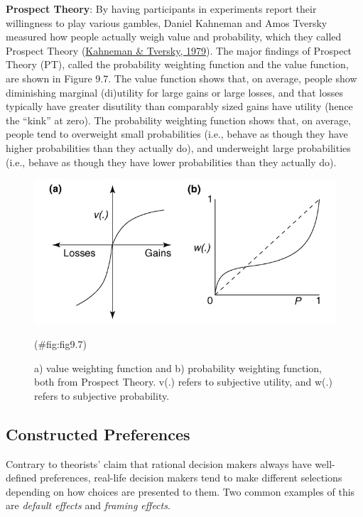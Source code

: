 \documentclass[
]{krantz}
\begin{document}
\textbf{Prospect Theory}: By having participants in experiments report their willingness to play various gambles, Daniel Kahneman and Amos Tversky measured how people actually weigh value and probability, which they called Prospect Theory (\protect\hyperlink{ref-kahneman1979prospect}{Kahneman \& Tversky, 1979}). The major findings of Prospect Theory (PT), called the probability weighting function and the value function, are shown in Figure 9.7. The value function shows that, on average, people show diminishing marginal (di)utility for large gains or large losses, and that losses typically have greater disutility than comparably sized gains have utility (hence the ``kink'' at zero). The probability weighting function shows that, on average, people tend to overweight small probabilities (i.e., behave as though they have higher probabilities than they actually do), and underweight large probabilities (i.e., behave as though they have lower probabilities than they actually do).

\begin{figure}

{\centering \includegraphics[width=0.6\linewidth]{images/ch9/fig7} 

}

\caption{a) value weighting function and b) probability weighting function, both from Prospect Theory. v(.) refers to subjective utility, and w(.) refers to subjective probability.}(\#fig:fig9.7)
\end{figure}

\hypertarget{constructed-preferences}{%
\subsection*{Constructed Preferences}\label{constructed-preferences}}


Contrary to theorists' claim that rational decision makers always have well-defined preferences, real-life decision makers tend to make different selections depending on how choices are presented to them. Two common examples of this are \emph{default effects} and \emph{framing effects}.
\end{document}
